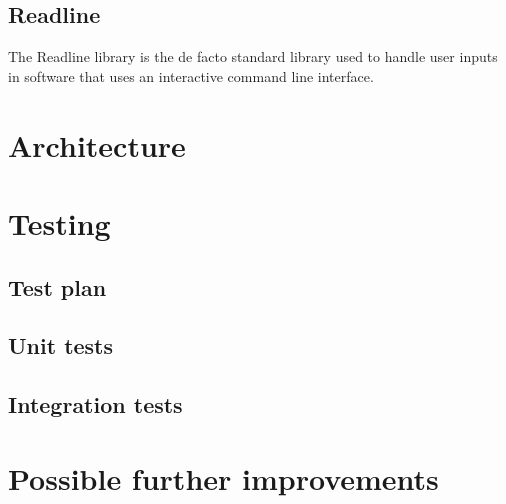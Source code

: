 \subsection*{Readline\cite{readline}}

The Readline library is the de facto standard library used to handle user
inputs in software that uses an interactive command line interface.

\section{Architecture}

\section{Testing}

\subsection{Test plan}

\subsection{Unit tests}

\subsection{Integration tests}

\section{Possible further improvements}

